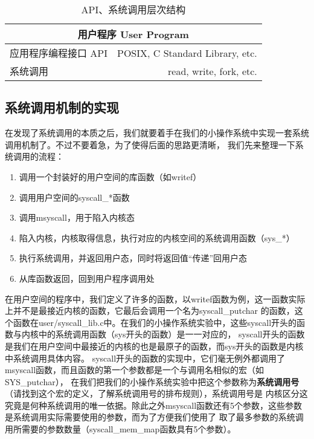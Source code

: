 \begin{table}[htbp]
\centering
\caption{API、系统调用层次结构}
\label{fig:api-and-syscall}
\begin{tabular}{|lr|}
\hline
\multicolumn{2}{|c|}{用户程序 User Program}        \\ \hline
应用程序编程接口 API & POSIX, C Standard Library, etc. \\ \hline
系统调用         & read, write, fork, etc.         \\ \hline
\end{tabular}
\end{table}

\newpage

\subsection{系统调用机制的实现}
在发现了系统调用的本质之后，我们就要着手在我们的小操作系统中实现一套系统调用机制了。不过不要着急，为了使得后面的思路更清晰，
我们先来整理一下系统调用的流程：
\begin{enumerate}
  \item 调用一个封装好的用户空间的库函数（如writef）
  \item 调用用户空间的syscall\_*函数
  \item 调用msyscall，用于陷入内核态
  \item 陷入内核，内核取得信息，执行对应的内核空间的系统调用函数（sys\_*）
  \item 执行系统调用，并返回用户态，同时将返回值“传递”回用户态
  \item 从库函数返回，回到用户程序调用处
\end{enumerate}

在用户空间的程序中，我们定义了许多的函数，以writef函数为例，这一函数实际上并不是最接近内核的函数，它最后会调用一个名为syscall\_putchar
的函数，这个函数在user/syscall\_lib.c中。在我们的小操作系统实验中，这些syscall开头的函数与内核中的系统调用函数（sys开头的函数）是一一对应的，
syscall开头的函数是我们在用户空间中最接近的内核的也是最原子的函数，而sys开头的函数是内核中系统调用具体内容。
syscall开头的函数的实现中，它们毫无例外都调用了msyscall函数，而且函数的第一个参数都是一个与调用名相似的宏（如SYS\_putchar），
在我们把我们的小操作系统实验中把这个参数称为\textbf{系统调用号}（请找到这个宏的定义，了解系统调用号的排布规则），系统调用号是
内核区分这究竟是何种系统调用的唯一依据。除此之外msyscall函数还有5个参数，这些参数是系统调用实际需要使用的参数，而为了方便我们使用了
取了最多参数的系统调用所需要的参数数量（syscall\_mem\_map函数具有5个参数）。


